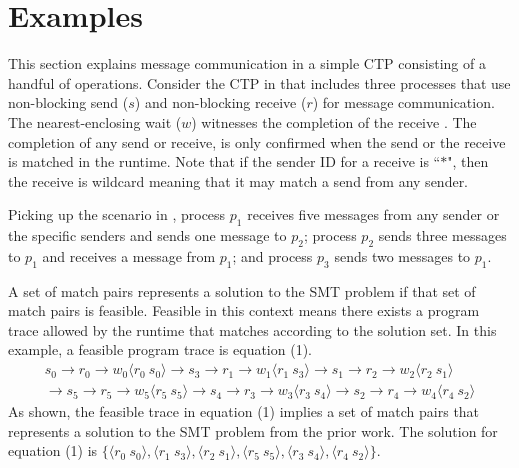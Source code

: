 \section{Examples}


\syncexample

\readyexample

This section explains message communication in a simple CTP consisting of a handful of operations. Consider the CTP in  that includes three processes that use non-blocking send ($s$) and non-blocking receive ($r$) for message communication. The nearest-enclosing wait ($w$) witnesses the completion of the receive \cite{DBLP:conf/kbse/HuangMM13}. The completion of any send or receive, is only confirmed when the send or the receive is matched in the runtime. Note that if the sender ID for a receive is ``$\ast$", then the receive is wildcard meaning that it may match a send from any sender. 

Picking up the scenario in , process $p_1$ receives five messages from any sender or the specific senders and sends one message to $p_2$; process $p_2$ sends three messages to $p_1$ and receives a message from $p_1$; and process $p_3$ sends two messages to $p_1$. 


A set of match pairs represents a solution to the SMT problem if that set of match pairs is feasible. 
Feasible in this context means there exists a program trace allowed by the runtime that matches according to the solution set. In this example, a feasible program trace is equation (1). 
\begin{equation}
\begin{split}
s_0\rightarrow r_0\rightarrow w_0\langle r_0\ s_0\rangle \rightarrow s_3\rightarrow r_1\rightarrow w_1\langle r_1\ s_3\rangle \rightarrow s_1\rightarrow r_2\rightarrow w_2\langle r_2\ s_1\rangle \\
\rightarrow s_5\rightarrow r_5\rightarrow w_5\langle r_5\ s_5\rangle \rightarrow s_4\rightarrow r_3\rightarrow w_3\langle r_3\ s_4\rangle \rightarrow s_2\rightarrow r_4\rightarrow w_4\langle r_4\ s_2\rangle
\end{split}
\end{equation} 
As shown, the feasible trace in equation (1) implies a set of match pairs that represents a solution to the SMT problem from the prior work. The solution for equation (1) is $\{\langle r_0\ s_0\rangle, \langle r_1\ s_3\rangle, \langle r_2\ s_1\rangle, \langle r_5\ s_5\rangle, \langle r_3\ s_4\rangle, \langle r_4\ s_2\rangle\}$.


